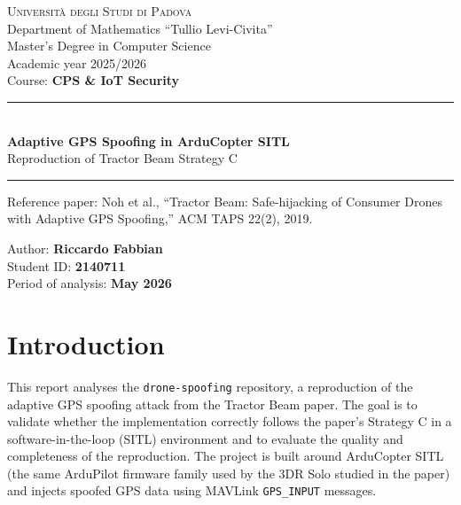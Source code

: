 \documentclass[12pt, a4paper]{article}
\begin{document}
\begin{titlepage}
  \centering

  {\large\scshape Università degli Studi di Padova}\\[0.1cm]
  {\normalsize Department of Mathematics ``Tullio Levi-Civita''}\\[0.1cm]
  {\normalsize Master's Degree in Computer Science}\\[0.1cm]
  {\normalsize Academic year 2025/2026}\\[0.1cm]
  {\normalsize Course: \textbf{CPS \& IoT Security}}

  \vspace{1.2cm}
  \rule{\linewidth}{0.5pt}\\[0.3cm]
  {\LARGE\bfseries Adaptive GPS Spoofing in ArduCopter SITL}\\[0.4cm]
  {\large Reproduction of Tractor Beam Strategy C}\\[0.3cm]
  \rule{\linewidth}{0.5pt}

  \vspace{0.8cm}
  {\small Reference paper: Noh et al., ``Tractor Beam: Safe-hijacking of Consumer Drones with Adaptive GPS Spoofing,'' ACM TAPS 22(2), 2019.}

  \vfill
  {\normalsize Author: \textbf{Riccardo Fabbian}}\\[0.2cm]
  {\normalsize Student ID: \textbf{2140711}}\\[0.2cm]
  {\normalsize Period of analysis: \textbf{May 2026}}
\end{titlepage}

\newpage
\tableofcontents

\newpage
\listoffigures

\newpage
\section{Introduction}

This report analyses the \texttt{drone-spoofing} repository, a reproduction of the adaptive GPS spoofing attack from the Tractor Beam paper. The goal is to validate whether the implementation correctly follows the paper's Strategy C in a software-in-the-loop (SITL) environment and to evaluate the quality and completeness of the reproduction. The project is built around ArduCopter SITL (the same ArduPilot firmware family used by the 3DR Solo studied in the paper) and injects spoofed GPS data using MAVLink \texttt{GPS\_INPUT} messages.
\end{document}
